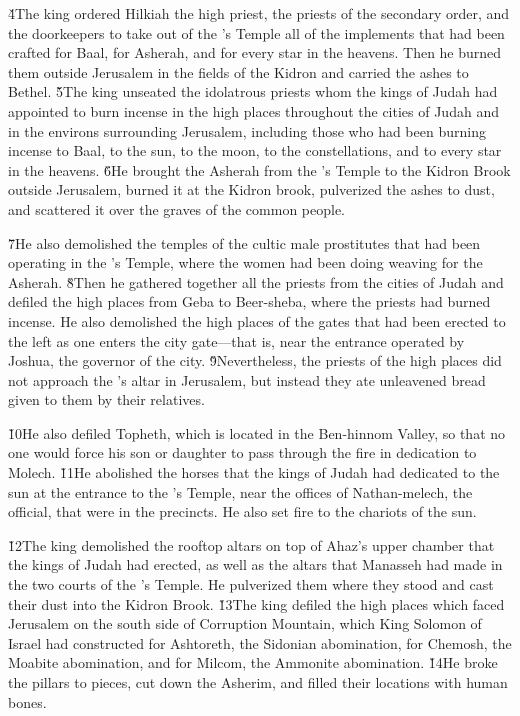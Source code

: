 \v{4}The king ordered Hilkiah the high priest, the priests of the secondary order, and the doorkeepers to take out of the 's Temple all of the implements that had been crafted for Baal, for Asherah, and for every star in the heavens. Then he burned them outside Jerusalem in the fields of the Kidron and carried the ashes to Bethel. \v{5}The king unseated the idolatrous priests whom the kings of Judah had appointed to burn incense in the high places throughout the cities of Judah and in the environs surrounding Jerusalem, including those who had been burning incense to Baal, to the sun, to the moon, to the constellations, and to every star in the heavens. \v{6}He brought the Asherah from the 's Temple to the Kidron Brook outside Jerusalem, burned it at the Kidron brook, pulverized the ashes to dust, and scattered it over the graves of the common people.

\v{7}He also demolished the temples of the cultic male prostitutes that had been operating in the 's Temple, where the women had been doing weaving for the Asherah. \v{8}Then he gathered together all the priests from the cities of Judah and defiled the high places from Geba to Beer-sheba, where the priests had burned incense. He also demolished the high places of the gates that had been erected to the left as one enters the city gate---that is, near the entrance operated by Joshua, the governor of the city. \v{9}Nevertheless, the priests of the high places did not approach the 's altar in Jerusalem, but instead they ate unleavened bread given to them by their relatives.

\v{10}He also defiled Topheth, which is located in the Ben-hinnom Valley, so that no one would force his son or daughter to pass through the fire in dedication to Molech. \v{11}He abolished the horses that the kings of Judah had dedicated to the sun at the entrance to the 's Temple, near the offices of Nathan-melech, the official, that were in the precincts. He also set fire to the chariots of the sun.

\v{12}The king demolished the rooftop altars on top of Ahaz's upper chamber that the kings of Judah had erected, as well as the altars that Manasseh had made in the two courts of the 's Temple. He pulverized them where they stood and cast their dust into the Kidron Brook. \v{13}The king defiled the high places which faced Jerusalem on the south side of Corruption Mountain, which King Solomon of Israel had constructed for Ashtoreth, the Sidonian abomination, for Chemosh, the Moabite abomination, and for Milcom, the Ammonite abomination. \v{14}He broke the pillars to pieces, cut down the Asherim, and filled their locations with human bones.

